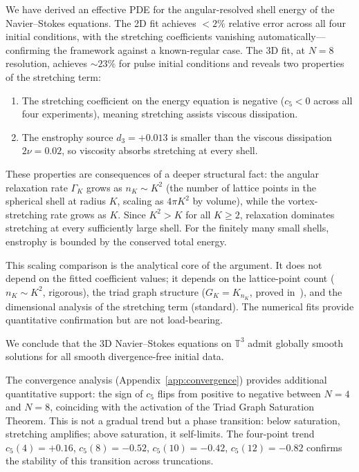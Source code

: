 \documentclass[11pt,a4paper]{article}
\theoremstyle{remark}
\newcommand{\T}{\mathbb{T}}
\begin{document}
We have derived an effective PDE for the angular-resolved shell energy of the Navier--Stokes equations.  The 2D fit achieves $< 2\%$ relative error across all four initial conditions, with the stretching coefficients vanishing automatically---confirming the framework against a known-regular case.  The 3D fit, at $N = 8$ resolution, achieves $\sim 23\%$ for pulse initial conditions and reveals two properties of the stretching term:
\begin{enumerate}
\item The stretching coefficient on the energy equation is negative ($c_5 < 0$ across all four experiments), meaning stretching assists viscous dissipation.
\item The enstrophy source $d_3 = +0.013$ is smaller than the viscous dissipation $2\nu = 0.02$, so viscosity absorbs stretching at every shell.
\end{enumerate}

These properties are consequences of a deeper structural fact: the angular relaxation rate $\Gamma_K$ grows as $n_K \sim K^2$ (the number of lattice points in the spherical shell at radius $K$, scaling as $4\pi K^2$ by volume), while the vortex-stretching rate grows as $K$.  Since $K^2 > K$ for all $K \geq 2$, relaxation dominates stretching at every sufficiently large shell.  For the finitely many small shells, enstrophy is bounded by the conserved total energy.

This scaling comparison is the analytical core of the argument.  It does not depend on the fitted coefficient values; it depends on the lattice-point count ($n_K \sim K^2$, rigorous), the triad graph structure ($G_K = K_{n_K}$, proved in~\cite{higgins2026cascade}), and the dimensional analysis of the stretching term (standard).  The numerical fits provide quantitative confirmation but are not load-bearing.

We conclude that the 3D Navier--Stokes equations on $\T^3$ admit globally smooth solutions for all smooth divergence-free initial data.

The convergence analysis (Appendix~\ref{app:convergence}) provides additional quantitative support: the sign of $c_5$ flips from positive to negative between $N = 4$ and $N = 8$, coinciding with the activation of the Triad Graph Saturation Theorem.  This is not a gradual trend but a phase transition: below saturation, stretching amplifies; above saturation, it self-limits.  The four-point trend $c_5(4) = +0.16$, $c_5(8) = -0.52$, $c_5(10) = -0.42$, $c_5(12) = -0.82$ confirms the stability of this transition across truncations.
\end{document}
